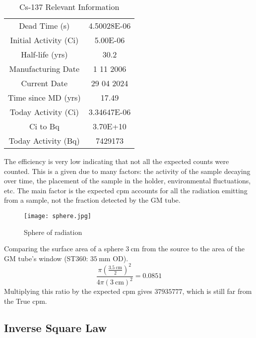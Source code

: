 \documentclass[11pt]{article}
\begin{document}
	\begin{table}[htbp]
		\centering
		\caption{Cs-137 Relevant Information}
		\begin{tabular}{cc}
			\toprule
			Dead Time (s)  & 4.50028E-06 \\
			Initial Activity (Ci) & 5.00E-06 \\
			Half-life (yrs) & 30.2 \\
			Manufacturing Date & 1 11 2006 \\
			Current Date & 29 04 2024 \\
			Time since MD (yrs) & 17.49 \\
			Today Activity (Ci) & 3.34647E-06 \\
			Ci to Bq & 3.70E+10 \\
			Today Activity (Bq) & 7429173 \\
			\bottomrule
		\end{tabular}%
		\label{tab:5_Table_2}%
	\end{table}%
	
	The efficiency is very low indicating that not all the expected counts were counted. This is a given due to many factors: the activity of the sample decaying over time, the placement of the sample in the holder, environmental fluctuations, etc. The main factor is the expected cpm accounts for all the radiation emitting from a sample, not the fraction detected by the GM tube.
	
	\begin{figure}[htbp]
		\centering
		\texttt{[image: sphere.jpg]}
		\caption{Sphere of radiation}
		\label{fig:}
	\end{figure}
	
	Comparing the surface area of a sphere $\qty{3}{\centi\meter}$ from the source to the area of the GM tube's window (ST360: $\qty{35}{\milli\meter}$ OD).
	\[
		\frac{\pi(\frac{\qty{3.5}{\centi\meter}}{2})^2}{4\pi(\qty{3}{\centi\meter})^2} = 0.0851
	\]
	Multiplying this ratio by the expected cpm gives $37935777$, which is still far from the True cpm.
	
	
\clearpage
	
	\subsection{Inverse Square Law}
	
\end{document}
